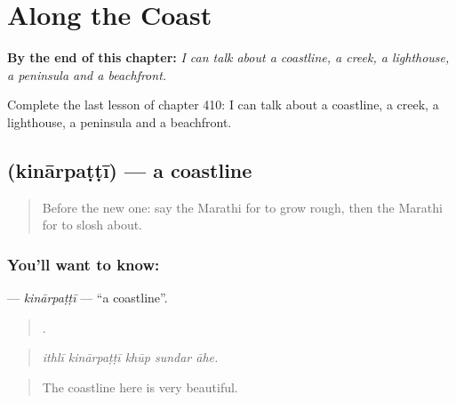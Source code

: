 
\chapter{Along the Coast}
\label{ch:mr-along-the-coast}

\begin{chapteropening}
\textbf{By the end of this chapter:} \emph{I can talk about a coastline, a creek, a lighthouse, a peninsula and a beachfront.}

Complete the last lesson of chapter 410: I can talk about a coastline, a creek, a lighthouse, a peninsula and a beachfront.
\end{chapteropening}

\section[\texorpdfstring{\mr{किनारपट्टी} (kinārpaṭṭī)}{किनारपट्टी (kinārpaṭṭī)}]{ (kinārpaṭṭī) — a coastline}

\label{lesson:MR-C410-kinarpatti}



\begin{quote}
Before the new one: say the Marathi for to grow rough, then the Marathi for to slosh about.
\end{quote}

\subsection*{You'll want to know: }
\textbf{} — \emph{kinārpaṭṭī} — \textquotedblleft{}a coastline\textquotedblright{}.

\begin{quote}
    .
\end{quote}

\begin{quote}
\emph{ithlī kinārpaṭṭī khūp sundar āhe.}
\end{quote}

\begin{quote}
The coastline here is very beautiful.
\end{quote}

